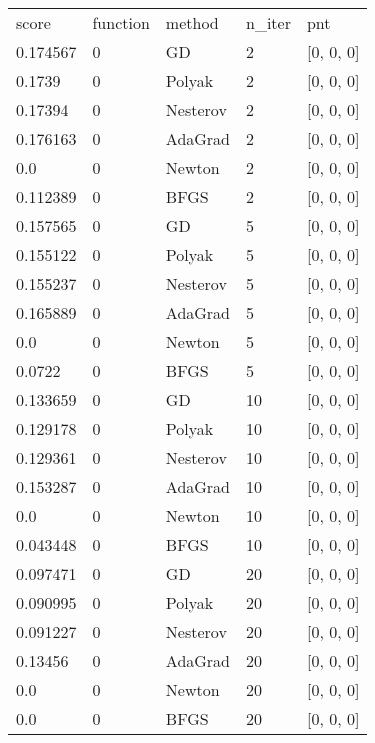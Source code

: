 \begin{tabular}{lllll}
     score & function &   method & n\_iter &              pnt \\
  0.174567 &        0 &       GD &      2 &        [0, 0, 0] \\
    0.1739 &        0 &   Polyak &      2 &        [0, 0, 0] \\
   0.17394 &        0 & Nesterov &      2 &        [0, 0, 0] \\
  0.176163 &        0 &  AdaGrad &      2 &        [0, 0, 0] \\
       0.0 &        0 &   Newton &      2 &        [0, 0, 0] \\
  0.112389 &        0 &     BFGS &      2 &        [0, 0, 0] \\
  0.157565 &        0 &       GD &      5 &        [0, 0, 0] \\
  0.155122 &        0 &   Polyak &      5 &        [0, 0, 0] \\
  0.155237 &        0 & Nesterov &      5 &        [0, 0, 0] \\
  0.165889 &        0 &  AdaGrad &      5 &        [0, 0, 0] \\
       0.0 &        0 &   Newton &      5 &        [0, 0, 0] \\
    0.0722 &        0 &     BFGS &      5 &        [0, 0, 0] \\
  0.133659 &        0 &       GD &     10 &        [0, 0, 0] \\
  0.129178 &        0 &   Polyak &     10 &        [0, 0, 0] \\
  0.129361 &        0 & Nesterov &     10 &        [0, 0, 0] \\
  0.153287 &        0 &  AdaGrad &     10 &        [0, 0, 0] \\
       0.0 &        0 &   Newton &     10 &        [0, 0, 0] \\
  0.043448 &        0 &     BFGS &     10 &        [0, 0, 0] \\
  0.097471 &        0 &       GD &     20 &        [0, 0, 0] \\
  0.090995 &        0 &   Polyak &     20 &        [0, 0, 0] \\
  0.091227 &        0 & Nesterov &     20 &        [0, 0, 0] \\
   0.13456 &        0 &  AdaGrad &     20 &        [0, 0, 0] \\
       0.0 &        0 &   Newton &     20 &        [0, 0, 0] \\
       0.0 &        0 &     BFGS &     20 &        [0, 0, 0] \\

\end{tabular}
